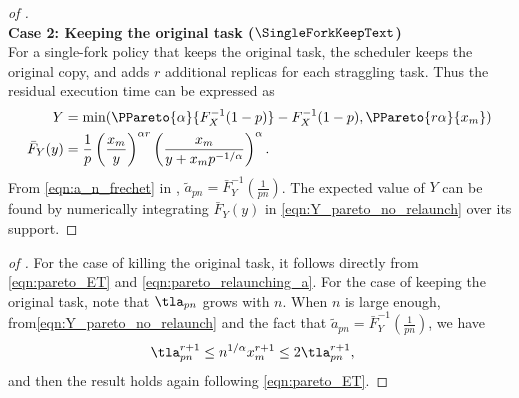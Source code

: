 \begin{proof}[of ]
~\\
\textbf{Case 2: Keeping the original task ($\SingleForkKeepText$)} \\
For a single-fork policy that keeps the original task, the scheduler keeps the original copy, and adds $r$
additional replicas for each straggling task. Thus the residual execution time can be expressed as
\begin{align}
Y &= \min( \PPareto{\alpha}{F_X^{-1}(1-p)} - F_X^{-1}(1-p),  \PPareto{r\alpha}{x_m} )  \\
\bar{F}_Y(y) &= \frac{1}{p} \left( \frac{x_m}{y} \right)^{\alpha r} \left( \frac{x_m}{y + x_m p^{-1/\alpha}} \right)^{\alpha} .\label{eqn:Y_pareto_no_relaunch}
\end{align}
From \eqref{eqn:a_n_frechet} in , $\tilde{a}_{pn} = \bar{F}_Y^{-1}\left(\frac{1}{pn} \right)$. The expected value of $Y$ can be found by numerically integrating $\bar{F}_Y(y)$ in \eqref{eqn:Y_pareto_no_relaunch} over its support. 
\end{proof}

\begin{proof}[of ]
For the case of killing the original task, it follows directly from \eqref{eqn:pareto_ET} and
\eqref{eqn:pareto_relaunching_a}. For the case of keeping the original task, note that $\tla_{pn}$ grows with $n$. When $n$ is large enough, from\eqref{eqn:Y_pareto_no_relaunch} and the fact that $\tilde{a}_{pn} = \bar{F}_Y^{-1}\left(\frac{1}{pn} \right)$, we have
\begin{align}
\tla_{pn} ^{r+1}
\leq
n^{1/\alpha} x_m^{r+1} 
&\leq 2 \tla_{pn} ^{r+1},
\end{align}
and then the result holds again following \eqref{eqn:pareto_ET}.
\end{proof}







